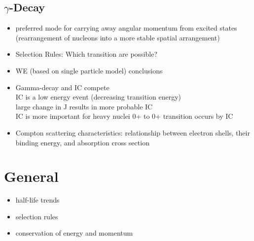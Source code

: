 \documentclass[letter]{article}
\begin{document}
\subsection{$\gamma$-Decay}
\begin{itemize}

\item preferred mode for carrying away angular momentum from excited states (rearrangement of nucleons into a more stable spatial arrangement)

\item Selection Rules: Which transition are possible?

\item WE (based on single particle model) conclusions

\item Gamma-decay and IC compete\\
\hspace{20pt} IC is a low energy event (decreasing transition energy)\\
\hspace{20pt} large change in J results in more probable IC\\
\hspace{20pt} IC is more important for heavy nuclei
\hspace{20pt} 0+ to 0+ transition occurs by IC

\item Compton scattering characteristics: relationship between electron shells, their binding energy, and absorption cross section

\end{itemize}

\section{General }

\begin{itemize}

\item half-life trends

\item selection rules

\item conservation of energy and momentum

\end{itemize}
\end{document}
